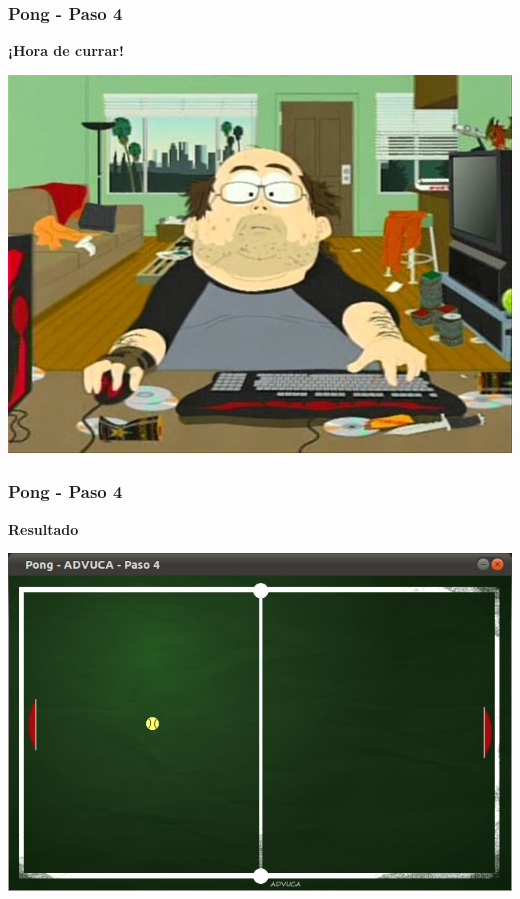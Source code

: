 \begin{frame}
	\frametitle{Pong - Paso 4}
	
    \begin{center}
        \textbf{¡Hora de currar!}
    \end{center}
	
    \begin{center}
		\includegraphics[scale=0.4]{img/currar-4.jpg}
	\end{center}	

\end{frame}

\begin{frame}
	\frametitle{Pong - Paso 4}
	
    \begin{center}
        \textbf{Resultado}
    \end{center}
	
    \begin{center}
		\includegraphics[scale=0.4]{img/pong-advuca-4.png}
	\end{center}	

\end{frame}


